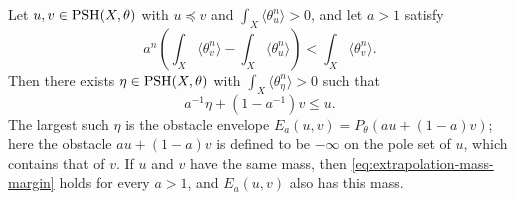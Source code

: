 \begin{theorem}\label{thm:positive-mass-extrapolation}
Let $u,v\in\mathrm{PSH}(X,\theta)$ with $u\preceq v$ and $\int_X\langle\theta_u^n\rangle>0$, and let $a>1$ satisfy
\begin{equation}\label{eq:extrapolation-mass-margin}
 a^n\left(\int_X\langle\theta_v^n\rangle-\int_X\langle\theta_u^n\rangle\right)<\int_X\langle\theta_v^n\rangle.
\end{equation}
Then there exists $\eta\in\mathrm{PSH}(X,\theta)$ with $\int_X\langle\theta_\eta^n\rangle>0$ such that
\begin{equation}\label{eq:extrapolation-convex-inequality}
 a^{-1}\eta+(1-a^{-1})v\leq u.
\end{equation}
The largest such $\eta$ is the obstacle envelope $E_a(u,v)=P_\theta(au+(1-a)v)$; here the obstacle $au+(1-a)v$ is defined to be $-\infty$ on the pole set of $u$, which contains that of $v$. If $u$ and $v$ have the same mass, then \eqref{eq:extrapolation-mass-margin} holds for every $a>1$, and $E_a(u,v)$ also has this mass.
\end{theorem}
